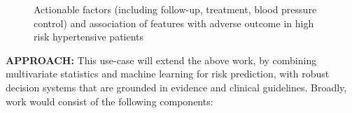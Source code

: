 \documentclass[
  letterpaper,
  DIV=11,
  numbers=noendperiod]{scrartcl}
\begin{document}
\begin{figure}


\caption{\label{fig-htn-actionable}Actionable factors (including
follow-up, treatment, blood pressure control) and association of
features with adverse outcome in high risk hypertensive patients}

\end{figure}%

\textbf{APPROACH:} This use-case will extend the above work, by
combining multivariate statistics and machine learning for risk
prediction, with robust decision systems that are grounded in evidence
and clinical guidelines. Broadly, work would consist of the following
components:
\end{document}
